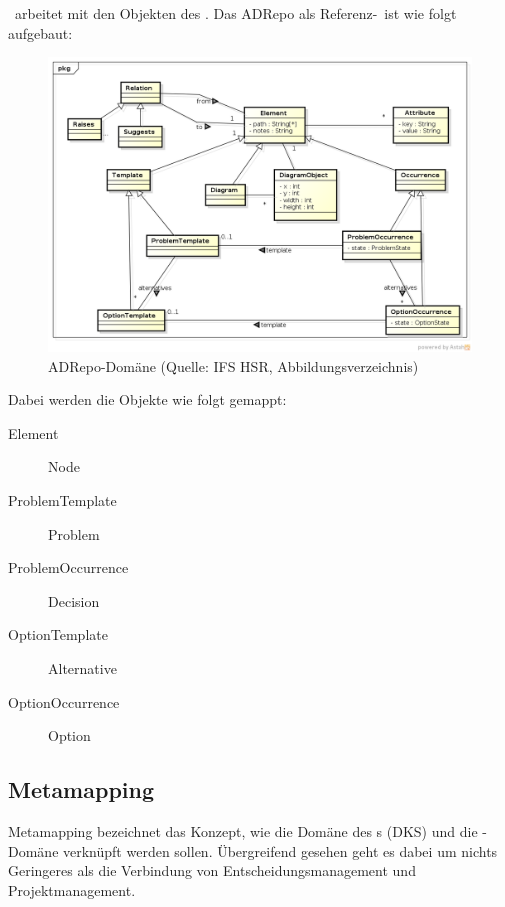 			\eeppi\ arbeitet mit den Objekten des \dks. Das ADRepo als Referenz-\dks\ ist wie folgt aufgebaut:
			\begin{figure}[H]
				\includegraphics[width=\linewidth]{architecture/media/img/dksDomain.png}
				\centering
				\caption[ADRepo-Domäne\newline 
				]{ADRepo-Domäne (Quelle: IFS HSR, Abbildungsverzeichnis)}
				\label{fig:dksDomain}
			\end{figure}
			
			Dabei werden die Objekte wie folgt gemappt:
			\begin{description}
				\item[Element] Node
				\item[ProblemTemplate] Problem
				\item[ProblemOccurrence] Decision
				\item[OptionTemplate] Alternative
				\item[OptionOccurrence] Option
			\end{description}
			
			
		\subsection{Metamapping}
			\label{subsec:metamapping}		
		
			Metamapping bezeichnet das Konzept, 
			wie die Domäne des \dks s (DKS) und die \eeppi -Domäne verknüpft werden sollen.
			Übergreifend gesehen geht es dabei um nichts Geringeres als die Verbindung von Entscheidungsmanagement und Projektmanagement.			
		
